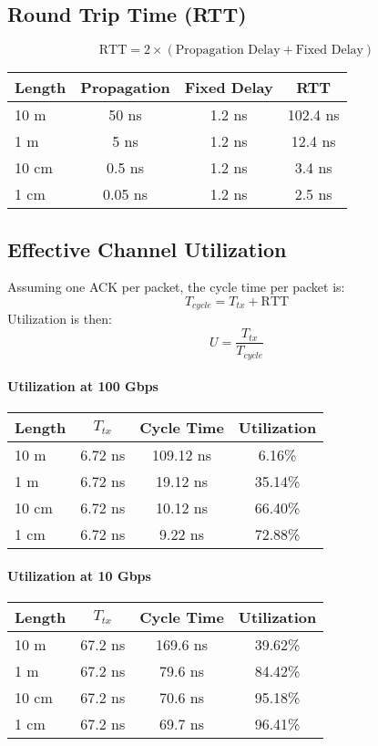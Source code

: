 \documentclass[../HFT-main.tex]{subfiles} %
\begin{document}
\subsection*{Round Trip Time (RTT)}
\[
\text{RTT} = 2 \times (\text{Propagation Delay} + \text{Fixed Delay})
\]
\begin{tabular}{@{}lccc@{}}
\toprule
Length & Propagation & Fixed Delay & RTT \\
\midrule
10 m & 50 ns & 1.2 ns & 102.4 ns \\
1 m & 5 ns & 1.2 ns & 12.4 ns \\
10 cm & 0.5 ns & 1.2 ns & 3.4 ns \\
1 cm & 0.05 ns & 1.2 ns & 2.5 ns \\
\bottomrule
\end{tabular}

\subsection*{Effective Channel Utilization}
Assuming one ACK per packet, the cycle time per packet is:
\[
T_{cycle} = T_{tx} + \text{RTT}
\]
Utilization is then:
\[
U = \frac{T_{tx}}{T_{cycle}}
\]

\paragraph{Utilization at 100 Gbps}
\begin{tabular}{@{}lccc@{}}
\toprule
Length & $T_{tx}$ & Cycle Time & Utilization \\
\midrule
10 m & 6.72 ns & 109.12 ns & 6.16\% \\
1 m & 6.72 ns & 19.12 ns & 35.14\% \\
10 cm & 6.72 ns & 10.12 ns & 66.40\% \\
1 cm & 6.72 ns & 9.22 ns & 72.88\% \\
\bottomrule
\end{tabular}

\paragraph{Utilization at 10 Gbps}
\begin{tabular}{@{}lccc@{}}
\toprule
Length & $T_{tx}$ & Cycle Time & Utilization \\
\midrule
10 m & 67.2 ns & 169.6 ns & 39.62\% \\
1 m & 67.2 ns & 79.6 ns & 84.42\% \\
10 cm & 67.2 ns & 70.6 ns & 95.18\% \\
1 cm & 67.2 ns & 69.7 ns & 96.41\% \\
\bottomrule
\end{tabular}
\end{document}
